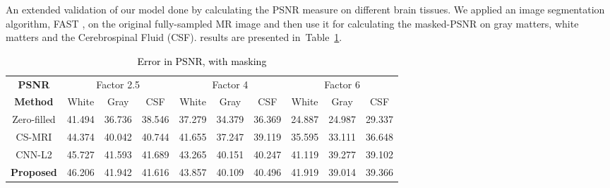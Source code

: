 \documentclass[review]{elsarticle}
\begin{document}
An extended validation of our model done by calculating the PSNR measure on different brain tissues. We applied an image segmentation algorithm, FAST \cite{zhang2001segmentation}, on the original fully-sampled MR image and then use it for calculating the masked-PSNR on gray matters, white matters and the Cerebrospinal Fluid (CSF). results are presented in~Table~\ref{tbl:PSNR_WITH_MASK}.


\begin{table}[H]
	\centering
\begin{tabular}{|c||c|c|c||c|c|c||c|c|c|}
	\hline 
	\textbf{PSNR} & \multicolumn{3}{c||}{Factor 2.5} & \multicolumn{3}{c||}{Factor 4} & \multicolumn{3}{c|}{Factor 6}\tabularnewline
	\cline{2-10} 
	 \textbf{Method}& White & Gray & CSF & White & Gray & CSF & White & Gray & CSF\tabularnewline
	 \hline 
	 Zero-filled & 41.494 & 36.736 & 38.546 & 37.279 & 34.379 & 36.369 & 24.887 & 24.987 & 29.337\tabularnewline
	 \hline 
	 CS-MRI & 44.374 & 40.042 & 40.744 & 41.655 & 37.247 & 39.119 & 35.595 & 33.111 & 36.648\tabularnewline
	 \hline 
	 CNN-L2 & 45.727 & 41.593 & 41.689 & 43.265 & 40.151 & 40.247 & 41.119 & 39.277 & 39.102\tabularnewline
	 \hline 
	 \textbf{Proposed} & 46.206 & 41.942 & 41.616 & 43.857 & 40.109 & 40.496 & 41.919 & 39.014 & 39.366\tabularnewline
	 \hline 
\end{tabular}
\caption{\textcolor{black}{\footnotesize{}{}Error in PSNR, with masking}{\footnotesize{}\label{tbl:PSNR_WITH_MASK}}}
\end{table}

\end{document}
